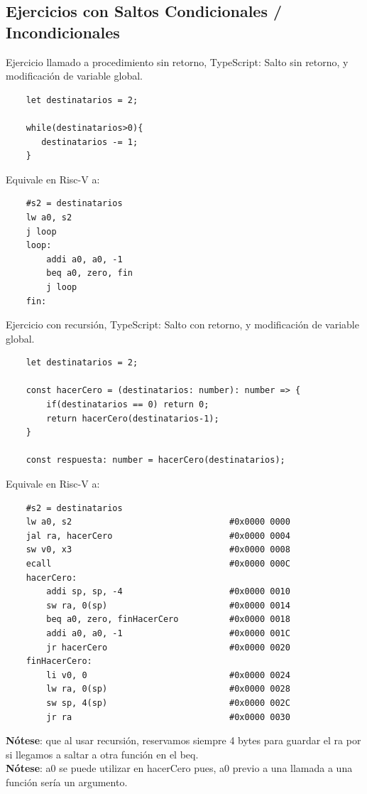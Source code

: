 \documentclass[10pt,a4paper]{article}
\begin{document}
\subsection*{Ejercicios con Saltos Condicionales / Incondicionales}
\label{subsec:ejercicios_con_saltos_condicionales_incondicionales}
Ejercicio llamado a procedimiento sin retorno,
TypeScript: Salto sin retorno, y modificación de variable global. 
\begin{lstlisting}
    let destinatarios = 2;

    while(destinatarios>0){
       destinatarios -= 1;
    }
\end{lstlisting}
Equivale en Risc-V a:
\begin{lstlisting}
    #s2 = destinatarios
    lw a0, s2 
    j loop
    loop: 
        addi a0, a0, -1
        beq a0, zero, fin 
        j loop
    fin:  
\end{lstlisting}
\label{ejercicio:saltos_condicionales_argumentos}
Ejercicio con recursión, 
TypeScript: Salto con retorno, y modificación de variable global. 
\begin{lstlisting}
    let destinatarios = 2;

    const hacerCero = (destinatarios: number): number => {
        if(destinatarios == 0) return 0; 
        return hacerCero(destinatarios-1);
    }

    const respuesta: number = hacerCero(destinatarios);
\end{lstlisting}
Equivale en Risc-V a:
\begin{lstlisting}
    #s2 = destinatarios
    lw a0, s2                               #0x0000 0000
    jal ra, hacerCero                       #0x0000 0004
    sw v0, x3                               #0x0000 0008
    ecall                                   #0x0000 000C
    hacerCero: 
        addi sp, sp, -4                     #0x0000 0010
        sw ra, 0(sp)                        #0x0000 0014 
        beq a0, zero, finHacerCero          #0x0000 0018
        addi a0, a0, -1                     #0x0000 001C
        jr hacerCero                        #0x0000 0020
    finHacerCero: 
        li v0, 0                            #0x0000 0024
        lw ra, 0(sp)                        #0x0000 0028
        sw sp, 4(sp)                        #0x0000 002C
        jr ra                               #0x0000 0030
\end{lstlisting}
\textbf{Nótese}: que al usar recursión, reservamos siempre 4 bytes para guardar el ra por si llegamos a saltar a otra función en el beq. \\
\textbf{Nótese}: a0 se puede utilizar en hacerCero pues, a0 previo a una llamada a una función sería un argumento.
\end{document}
